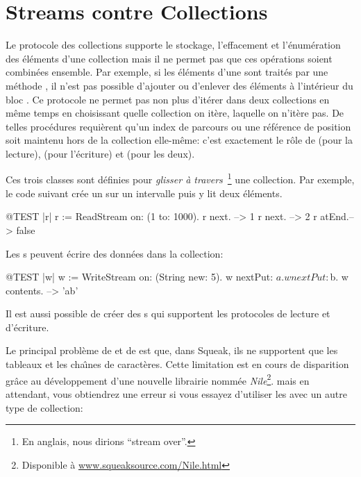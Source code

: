 \documentclass[a4paper,10pt,twoside]{book}
\begin{document}
\section{Streams contre Collections}

Le protocole des collections supporte le stockage, l'effacement et l'\'enum\'eration
des \'el\'ements d'une collection mais il ne permet pas que ces op\'erations
soient combin\'ees ensemble. Par exemple, si les \'el\'ements d'une 
 sont trait\'es par une m\'ethode , il n'est pas possible d'ajouter ou d'enlever des \'el\'ements
\`a l'int\'erieur du bloc .
Ce protocole ne permet pas non plus d'it\'erer dans deux collections
en m\^eme temps en choisissant quelle collection on itère, laquelle on n'itère pas.
De telles proc\'edures requi\`erent qu'un index de parcours ou une r\'ef\'erence
de position soit maintenu hors de la collection elle-m\^eme:
c'est exactement le r\^ole de  
 (pour la lecture),  (pour l'\'ecriture) et  (pour les deux).

Ces trois classes sont d\'efinies pour \emph{glisser à travers}~\footnote{En anglais, nous dirions ``stream over''.} une collection.
Par exemple, le code suivant cr\'ee un \stream sur un intervalle puis y lit deux \'el\'ements.
\begin{code}{@TEST |r|}
r := ReadStream on: (1 to: 1000).
r next.   --> 1
r next.   --> 2
r atEnd.--> false
\end{code}

Les s peuvent \'ecrire des donn\'ees dans la collection:
\begin{code}{@TEST |w|}
w := WriteStream on: (String new: 5).
w nextPut: $a.
w nextPut: $b.
w contents. -->  'ab'
\end{code}

Il est aussi possible de cr\'eer des s qui supportent
les protocoles de lecture et d'\'ecriture.

Le principal probl\`eme de  et de 
est que, dans Squeak, ils ne supportent que les tableaux et les 
cha\^{\i}nes de caract\`eres. Cette limitation est en cours de
disparition gr\^ace au d\'eveloppement d'une nouvelle librairie
nomm\'ee \emph{Nile}\footnote{Disponible \`a \url{www.squeaksource.com/Nile.html}}. mais en attendant, vous obtiendrez une erreur
si vous essayez d'utiliser les \streams avec un autre type de collection:
\end{document}
